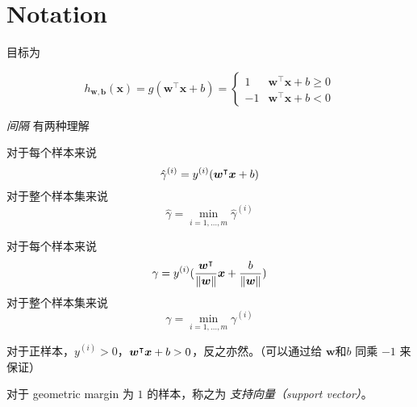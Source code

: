 \section{Notation}
	目标为
	\begin{df}
		\begin{equation*}
			h_{\bm{w},\bm{b}} (\bm{x}) = g( \bm{w}^\intercal \bm{x} + b ) = 
			\begin{cases}
				1 	& \bm{w}^\intercal \bm{x} + b \geq 0 \\
				-1 	& \bm{w}^\intercal \bm{x} + b < 0
			\end{cases}
		\end{equation*}			
	\end{df}
	
	\emph{间隔} 有两种理解
	\begin{df}
		对于每个样本来说
		\begin{equation*}
			\hat{\gamma}^{(i)} = y^{(i)} (\bm{w^}\intercal \bm{x} + b)
		\end{equation*}
		对于整个样本集来说
		\begin{equation*}
			\hat{\gamma} = \min_{i=1,\ldots,m}{\hat{\gamma}^{(i)}}
		\end{equation*}
	\end{df}
	\begin{df}
		对于每个样本来说
		\begin{equation*}
			\gamma = y^{(i)} (\frac{\bm{w^}\intercal}{\| \bm{w} \|} \bm{x} + \frac{b}{\| \bm{w} \|})			
		\end{equation*}
		对于整个样本集来说
			\begin{equation*}
				\gamma = \min_{i=1,\ldots,m}{\gamma^{(i)}}
			\end{equation*}	
	\end{df}
	
	对于正样本，$ y^{(i)} > 0 $，$ \bm{w^}\intercal \bm{x} + b > 0$，反之亦然。（可以通过给 $ \bm{w} \text{和} b$ 同乘 $ -1 $ 来保证）
	
	对于 geometric margin 为 $ 1 $ 的样本，称之为 \emph{支持向量（support vector）}。
	
